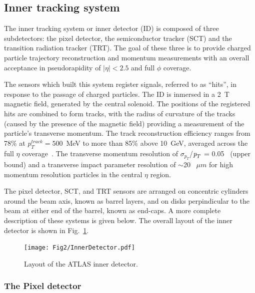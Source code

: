 \subsection{Inner tracking system}\label{sec:atlasID}

The inner tracking system or inner detector (ID) is composed of three subdetectors: the pixel detector, the semiconductor tracker (SCT) and the transition radiation tracker (TRT). The goal of these three is to provide charged particle trajectory reconstruction and momentum measurements with an overall acceptance in pseudorapidity of $|\eta| < 2.5$ and full $\phi$ coverage. 

The sensors which built this system register signals, referred to as ``hits'', in response to the passage of charged particles. The ID is inmersed in a 2~T magnetic field, generated by the central solenoid. The positions of the registered hits are combined to form tracks, with the radius of curvature  of the tracks (caused by the presence of the magnetic field) providing a measurement of the particle’s transverse momentum. The track reconstruction efficiency ranges from 78\% at $p^{track}_{T} = 500$~MeV to more than 85\% above 10~GeV, averaged across the full $\eta$ coverage~\cite{chargemultiplicity}. The transverse momentum resolution of $\sigma_{p_T}$/${\emph{p}_{T}}$ = 0.05~\cite{ATLAS-CONF-2010-009} (upper bound) and a transverse impact parameter resolution of $\sim$20~ $\mu m$ for high momentum resolution particles in the central $\eta$ region\cite{ATLAS-CONF-2010-070}. 

The pixel detector, SCT, and TRT sensors are arranged on concentric cylinders around the beam axis, known as barrel layers, and on disks perpindicular to the beam at either end of the barrel, known as end-caps. A more complete description of these systems is given below. The overall layout of the inner detector is shown in Fig.~\ref{fig:figinner}. 


\begin{figure}[htbp]
  \begin{center}
      \texttt{[image: Fig2/InnerDetector.pdf]}
    \caption{Layout of the ATLAS inner detector.}
    \label{fig:figinner}
  \end{center}
\end{figure}


\subsubsection{The Pixel detector}

